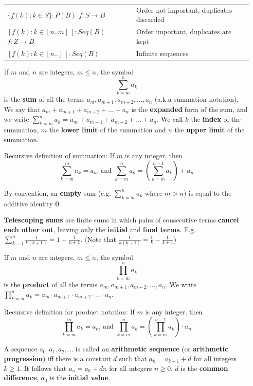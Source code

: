 \documentclass{article}
\begin{document}
\begin{description}
    \begingroup
	\setlength{\tabcolsep}{6pt} 
	\renewcommand{\arraystretch}{1.5} 
	\begin{table}[h]
		\centering
		\begin{tabular}{lp{6in}}
			$\{f(k):k\in S\}:P(B)$ \quad $f:S\to B$ & Order not important, duplicates discarded \\
			$[f(k):k\in[n..m]\;]:Seq(B)$ \quad $f:Z \to B$ & Order important, duplicates are kept \\
			$[f(k):k\in[n..]\;]:Seq(B)$ & Infinite sequences \\
		\end{tabular}
	\end{table}	     
	\endgroup
	
    \item[Summation] If $m$ and $n$ are integers, $m\leq n$, the symbol \[\sum_{k=m}^{n}a_{k}\] is the \textbf{sum} of all the terms $a_{m}, a_{m+1},a_{m+2},\dots,a_{n}$ (a.k.a summation notation). We say that $a_{m} +  a_{m+1} + a_{m+2} + \dots + a_{n}$ is the \textbf{expanded} form of the sum, and we write $\sum_{k=m}^{n}a_{k} = a_{m} + a_{m+1} + a_{m+2} + \dots + a_{n}$. We call $k$ the \textbf{index} of the summation, $m$ the \textbf{lower limit} of the summation and $n$ the \textbf{upper limit} of the summation.
    \item \qquad Recursive definition of summation: If $m$ is any integer, then \[\sum_{k=m}^{m}a_{k}=a_{m} \text{ and } \sum_{k=m}^{n}a_{k} = (\sum_{k=m}^{n-1}a_{k})+a_{n}\]
    \item \qquad By convention, an \textbf{empty} sum (e.g. $\sum_{k=m}^{n}a_{k}$ where $m>n$) is equal to the additive identity \textbf{0}.
    \item \qquad \textbf{Telescoping sums} are finite sums in which pairs of consecutive terms \textbf{cancel each other out}, leaving only the \textbf{initial} and \textbf{final terms}. E.g. $\sum_{k=1}^{n}\frac{1}{k(k+1)}=1-\frac{1}{n+1}$. (Note that $\frac{1}{k(k+1)}=\frac{1}{k}-\frac{1}{k+1}$)
    \item[Product Notation]If $m$ and $n$ are integers, $m\leq n$, the symbol \[\prod_{k=m}^{n}a_{k}\] is the \textbf{product} of all the terms $a_{m}, a_{m+1},a_{m+2},\dots,a_{n}$. We write $\prod_{k=m}^{n}a_{k}=a_{m} \cdot a_{m+1} \cdot a_{m+2} \cdot \dots \cdot a_{n}$.
    \item \qquad Recursive definition for product notation: If $m$ is any integer, then \[\prod_{k=m}^{m}a_{k}=a_{m} \text{ and } \prod_{k=m}^{n}a_{k}=(\prod_{k=m}^{n-1}a_{k})\cdot a_{n} \]
    \item[Arithmetic Sequence] A sequence $a_{0}, a_{1},a_{2},\dots$ is called an \textbf{arithmetic sequence} (or \textbf{arithmetic progression}) iff there is a constant $d$ such that $a_{k}=a_{k-1}+d$ for all integers $k\geq 1$. It follows that $a_{n}= a_{0}+dn$ for all integers $n\geq 0$. $d$ is the \textbf{common difference}, $a_{0}$ is the \textbf{initial value}.

\end{description}
\end{document}
